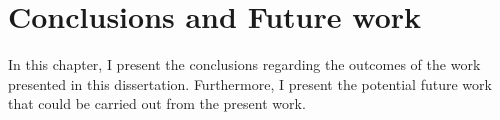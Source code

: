 
\chapter[Conclusions and Future work]{Conclusions and Future work}
\label{ch6}

In this chapter, I present the conclusions regarding the outcomes of the work presented in this dissertation. 
Furthermore, I present the potential future work that could be carried out from the present work.





